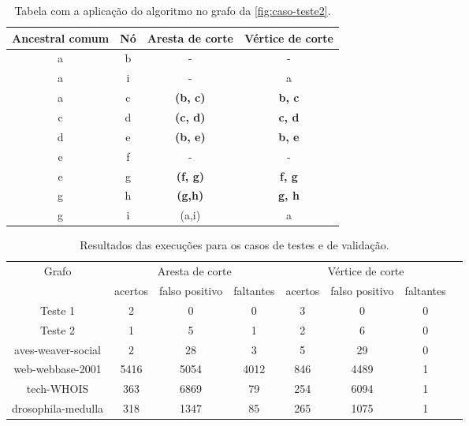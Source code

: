 \documentclass[
	article,
	12pt,
	openright,
	oneside,
	a4paper,
	english,
	french,
	spanish,
	brazil
	]{abntex2}
\begin{document}
\begin{figure*}[htb]
\begin{subfigure}{0.45\textwidth}
    \end{subfigure}
\end{figure*}

\begin{table*}[htb]
    \centering
    \caption{Tabela com a aplicação do algoritmo no grafo da \autoref{fig:caso-teste2}.}
    \begin{tabular}{c|c|c|c}
        \label{tab:caso2}
        Ancestral comum & Nó & Aresta de corte & Vértice de corte \\
        \hline
        a & b & - & - \\
        a & i & - & a \\
        a & c & \textbf{(b, c)} & \textbf{b, c} \\
        c & d & \textbf{(c, d)} & \textbf{c, d} \\
        d & e & \textbf{(b, e)} & \textbf{b, e} \\
        e & f & - & - \\
        e & g & \textbf{(f, g)} & \textbf{f, g} \\
        g & h & \textbf{(g,h)} & \textbf{g, h} \\
        g & i & (a,i) & a \\
        
    \end{tabular}
\end{table*}

\begin{table*}[htb]
\centering
\caption{Resultados das execuções para os casos de testes e de validação.}
\begin{tabular}{c|c|c|c|c|c|c|c}
\label{tab:execucoes}
\multirow{2}{*}{Grafo} & \multicolumn{3}{c|}{Aresta de corte } & \multicolumn{3}{c|}{Vértice de corte } &   \\ 
\cline{2-7}
 & acertos & falso positivo & faltantes  & acertos & falso positivo & faltantes   &   \\ 
\cline{1-7}
Teste 1 & 2 & 0 & 0 & 3 & 0 & 0 \\
Teste 2 & 1 & 5 & 1 & 2 & 6 & 0 \\
aves-weaver-social & 2 & 28 & 3 & 5 & 29 & 0 \\
web-webbase-2001 & 5416 & 5054 & 4012 & 846 & 4489 & 1 \\
tech-WHOIS & 363 & 6869 & 79 & 254 & 6094 & 1 \\
drosophila-medulla & 318 & 1347 & 85 & 265 & 1075 & 1 \\
\end{tabular}
\end{table*}
\end{document}
